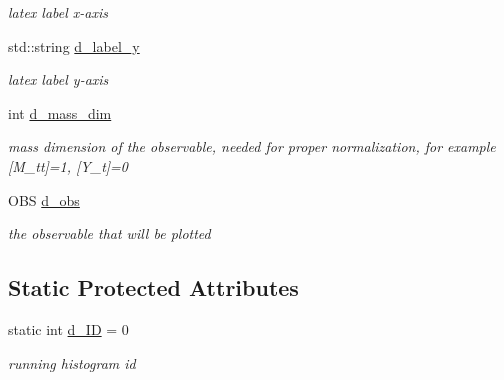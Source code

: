 \begin{DoxyCompactItemize}
\begin{DoxyCompactList}\small\item\em latex label x-\/axis \end{DoxyCompactList}\item 
\hypertarget{classHistArray_a884c9ad37bb3bc65bed3c33928c12f7d}{std\-::string \hyperlink{classHistArray_a884c9ad37bb3bc65bed3c33928c12f7d}{d\-\_\-label\-\_\-y}}\label{classHistArray_a884c9ad37bb3bc65bed3c33928c12f7d}

\begin{DoxyCompactList}\small\item\em latex label y-\/axis \end{DoxyCompactList}\item 
\hypertarget{classHistArray_ac682fdf0aeedf8f0b9fb8c4c4b1fee71}{int \hyperlink{classHistArray_ac682fdf0aeedf8f0b9fb8c4c4b1fee71}{d\-\_\-mass\-\_\-dim}}\label{classHistArray_ac682fdf0aeedf8f0b9fb8c4c4b1fee71}

\begin{DoxyCompactList}\small\item\em mass dimension of the observable, needed for proper normalization, for example \mbox{[}M\-\_\-tt\mbox{]}=1, \mbox{[}Y\-\_\-t\mbox{]}=0 \end{DoxyCompactList}\item 
\hypertarget{classHistArray_a7d8b20c78afd46e59467379cf4fe472b}{O\-B\-S \hyperlink{classHistArray_a7d8b20c78afd46e59467379cf4fe472b}{d\-\_\-obs}}\label{classHistArray_a7d8b20c78afd46e59467379cf4fe472b}

\begin{DoxyCompactList}\small\item\em the observable that will be plotted \end{DoxyCompactList}\end{DoxyCompactItemize}
\subsection*{Static Protected Attributes}
\begin{DoxyCompactItemize}
\item 
\hypertarget{classHistArray_a01616b3115c8b243e2bd924788d47589}{static int \hyperlink{classHistArray_a01616b3115c8b243e2bd924788d47589}{d\-\_\-\-I\-D} = 0}\label{classHistArray_a01616b3115c8b243e2bd924788d47589}

\begin{DoxyCompactList}\small\item\em running histogram id \end{DoxyCompactList}\end{DoxyCompactItemize}



